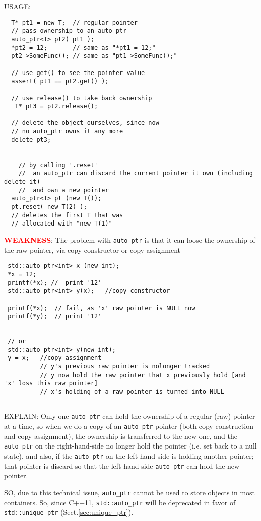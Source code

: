USAGE:
\begin{lstlisting}
  T* pt1 = new T;  // regular pointer  
  // pass ownership to an auto_ptr
  auto_ptr<T> pt2( pt1 );
  *pt2 = 12;       // same as "*pt1 = 12;"
  pt2->SomeFunc(); // same as "pt1->SomeFunc();"      

  // use get() to see the pointer value
  assert( pt1 == pt2.get() );

  // use release() to take back ownership
   T* pt3 = pt2.release();
                  
  // delete the object ourselves, since now
  // no auto_ptr owns it any more
  delete pt3;


    // by calling '.reset'
    //  an auto_ptr can discard the current pointer it own (including delete it)
    //  and own a new pointer
  auto_ptr<T> pt (new T());
  pt.reset( new T(2) );
  // deletes the first T that was
  // allocated with "new T(1)"
\end{lstlisting}

\textcolor{red}{\bf WEAKNESS}: The problem with \verb!auto_ptr! is that it can loose the
ownership of the raw pointer, via copy constructor or copy assignment
\begin{verbatim}
 std::auto_ptr<int> x (new int);
 *x = 12; 
 printf(*x); //  print '12'
 std::auto_ptr<int> y(x);   //copy constructor
 
 printf(*x);  // fail, as 'x' raw pointer is NULL now
 printf(*y);  // print '12'
 
 
 // or 
 std::auto_ptr<int> y(new int);
 y = x;   //copy assignment 
          // y's previous raw pointer is nolonger tracked
          // y now hold the raw pointer that x previously hold [and 'x' loss this raw pointer]
          // x's holding of a raw pointer is turned into NULL
  
\end{verbatim}

EXPLAIN: Only one \verb!auto_ptr! can hold the ownership of a regular (raw)
pointer at a time, so when we do a copy of an \verb!auto_ptr! pointer (both copy
construction and copy assignment), the ownership is transferred to the new one,
and the \verb!auto_ptr! on the right-hand-side no longer hold the pointer (i.e.
set back to a null state), and also, if the \verb!auto_ptr! on the
left-hand-side is holding another pointer; that pointer is discard so that the
left-hand-side \verb!auto_ptr! can hold the new pointer.


SO, due to this technical issue, \verb!auto_ptr! cannot be used to store objects
in most containers. So, since C++11, \verb!std::auto_ptr! will be deprecated in
favor of \verb!std::unique_ptr! (Sect.\ref{sec:unique_ptr}).

